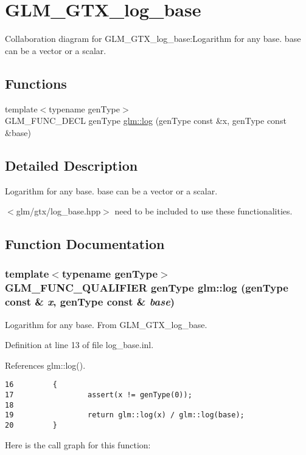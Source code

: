 \hypertarget{group__gtx__log__base}{
\section{GLM\_\-GTX\_\-log\_\-base}
\label{group__gtx__log__base}
}


Collaboration diagram for GLM\_\-GTX\_\-log\_\-base:Logarithm for any base. base can be a vector or a scalar.  
\subsection*{Functions}
\begin{CompactItemize}
\item 
{\footnotesize template$<$typename genType$>$ }\\GLM\_\-FUNC\_\-DECL genType \hyperlink{group__gtx__log__base_g62d0cda357eb4e0a3dc7d23241bbb66b}{glm::log} (genType const \&x, genType const \&base)
\end{CompactItemize}


\subsection{Detailed Description}
Logarithm for any base. base can be a vector or a scalar. 

$<$glm/gtx/log\_\-base.hpp$>$ need to be included to use these functionalities. 

\subsection{Function Documentation}
\hypertarget{group__gtx__log__base_g62d0cda357eb4e0a3dc7d23241bbb66b}{
\subsubsection[log]{\setlength{\rightskip}{0pt plus 5cm}template$<$typename genType$>$ GLM\_\-FUNC\_\-QUALIFIER genType glm::log (genType const \& {\em x}, \/  genType const \& {\em base})}}
\label{group__gtx__log__base_g62d0cda357eb4e0a3dc7d23241bbb66b}


Logarithm for any base. From GLM\_\-GTX\_\-log\_\-base. 

Definition at line 13 of file log\_\-base.inl.

References glm::log().

\begin{Code}\begin{verbatim}16         {
17                 assert(x != genType(0));
18 
19                 return glm::log(x) / glm::log(base);
20         }
\end{verbatim}
\end{Code}




Here is the call graph for this function:
